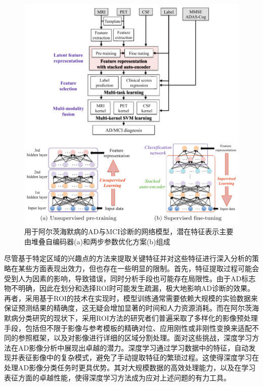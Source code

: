    \begin{figure}[htbp]
      \centering
      \includegraphics[width=0.95\linewidth]{figs/2classify.png}
      \caption{用于阿尔茨海默病的AD与MCI诊断的网络模型，潜在特征表示主要由堆叠自编码器(a)和两步参数优化方案(b)组成}\label{coarse2classify}
    \end{figure}
    \fi
    
尽管基于特定区域的兴趣点的方法来提取关键特征并对这些特征进行深入分析的策略在某些方面表现出效力，但也存在一些明显的限制。首先，特征提取过程可能会受到人为因素的影响，导致错误，同时分析手段也可能存在局限性。由于AD标志物不明确，因此在划分和选择ROI时可能发生疏漏，极大地影响AD诊断的效果。再者，采用基于ROI的技术在实现时，模型训练通常需要依赖大规模的实验数据来保证预测结果的精确度，这无疑会增加显著的时间和人力资源消耗。而在阿尔茨海默病分类研究的现状下，采用ROI方法的研究者们普遍采取了多样化的影像预处理手段，包括但不限于影像与参考模板的精确对位、应用刚性或非刚性变换来适配不同的参照框架，以及对影像进行详细的区域分割处理。面对这些挑战，深度学习方法在AD影像分析中展现出卓越的潜力\cite{suk2013deep,so2019deep,suk2014hierarchical,tufail2021classification,khvostikov20183d}。深度学习通过学习数据中的特征，自动发现并表征影像中的复杂模式，避免了手动提取特征的繁琐过程。这使得深度学习在处理AD影像分类任务时更具优势。其对大规模数据的高效处理能力，以及在学习表征方面的卓越性能，使得深度学习方法成为应对上述问题的有力工具。

